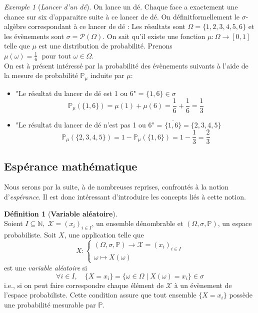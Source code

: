 \documentclass[12pt,a4paper]{report}
\theoremstyle{definition}%
\newtheorem{definition}{Définition}[chapter]
\theoremstyle{remark}
\newtheorem{example}{Exemple}[chapter]
\newcommand{\ie}{i.e., }
\newcommand{\pr}{\mathbb{P}}
\let\labelitemi\labelitemii
\begin{document}
\begin{example}[\textit{Lancer d'un dé}]\label{die}
	On lance un dé. Chaque face a exactement une chance sur six d'apparaitre suite à ce lancer de dé. On définitformellement le $\sigma$-algèbre correspondant à ce lancer de dé :
	Les résultats sont $\Omega = \{1, 2, 3, 4, 5, 6\}$ et les évènements sont $\sigma = \mathcal{P}(\Omega)$.
	On sait qu'il existe une fonction $\mu: \Omega \rightarrow [0,1]$ telle que $\mu$ est une distribution de probabilité. Prenons $\mu(\omega) = \frac{1}{6} \; \text{ pour tout } \omega \in \Omega$.\\
	On est à présent intéressé par la probabilité des évènements suivants à l'aide de la mesure de probabilité $\pr_{\mu}$ induite par $\mu$:
	\begin{itemize}
		\renewcommand{\labelitemi}{\tiny$\bullet$}
		\item "Le résultat du lancer de dé est 1 ou 6" = $\{1, 6\} \in \sigma$
		\[\pr_{\mu}(\{1,6\}) = \mu(1) + \mu(6) = \frac{1}{6} + \frac{1}{6} = \frac{1}{3}\]
		\item "Le résultat du lancer de dé n'est pas 1 ou 6" = $\overline{\{1, 6\}} = \{2, 3, 4, 5\}$
		\[\pr_{\mu}(\{2, 3, 4, 5\}) = 1 - \pr_{\mu}(\{1, 6\}) = 1 - \frac{1}{3} = \frac{2}{3}\]
	\end{itemize}
\end{example}

\subsection*{Espérance mathématique}
Nous serons par la suite, à de nombreuses reprises, confrontés à la notion d'\textit{espérance}. Il est donc intéressant d'introduire les concepts liés à cette notion.

\begin{definition}[\textbf{Variable aléatoire}]~\cite{Course2} \\
	Soient $I \subseteq \mathbb{N}, \; \mathcal X = (x_i)_{i \in I}$, un ensemble dénombrable et $(\Omega, \sigma, \pr)$, un espace probabiliste. Soit $X$, une application telle que
	\[X :
	\begin{cases}
	(\Omega, \sigma, \pr) \rightarrow \mathcal{X} = (x_i)_{i \in I} \\
	\omega \mapsto X(\omega)
	\end{cases}
	\]
	est une \textit{variable aléatoire} si
	\[\forall i \in I, \quad \{X = x_i\} = \{\omega \in \Omega \; | \; X(\omega) = x_i \} \in \sigma\]
	\ie si on peut faire correspondre chaque élément de $\mathcal{X}$  à un évènement de l'espace probabiliste. Cette condition assure que tout ensemble $\{X = x_i\}$ possède une probabilité mesurable par $\pr$.
\end{definition}
\end{document}
